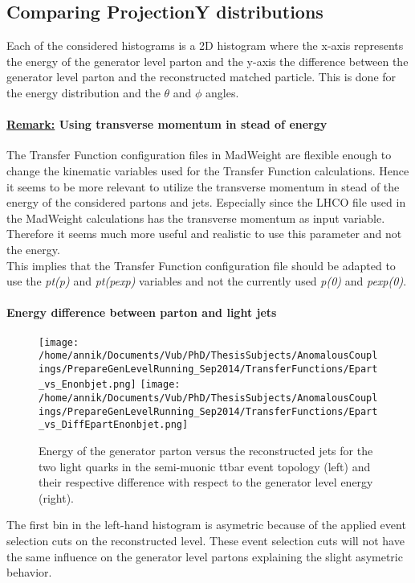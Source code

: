 \subsection{Comparing ProjectionY distributions}\label{subsubsec::FitRanges}
Each of the considered histograms is a 2D histogram where the x-axis represents the energy of the generator level parton and the y-axis the difference between the generator level parton and the reconstructed matched particle. This is done for the energy distribution and the $\theta$ and $\phi$ angles.

\paragraph{\underline{Remark:} Using transverse momentum in stead of energy\\}
The Transfer Function configuration files in MadWeight are flexible enough to change the kinematic variables used for the Transfer Function calculations. Hence it seems to be more relevant to utilize the transverse momentum in stead of the energy of the considered partons and jets. Especially since the LHCO file used in the MadWeight calculations has the transverse momentum as input variable. Therefore it seems much more useful and realistic to use this parameter and not the energy.\\
This implies that the Transfer Function configuration file should be adapted to use the \textit{pt(p)} and \textit{pt(pexp)} variables and not the currently used \textit{p(0)} and \textit{pexp(0)}.

\paragraph{Energy difference between parton and light jets\\}
\begin{figure}[!h]
  \centering
  \texttt{[image: /home/annik/Documents/Vub/PhD/ThesisSubjects/AnomalousCouplings/PrepareGenLevelRunning\_Sep2014/TransferFunctions/Epart\_vs\_Enonbjet.png]}
  \texttt{[image: /home/annik/Documents/Vub/PhD/ThesisSubjects/AnomalousCouplings/PrepareGenLevelRunning\_Sep2014/TransferFunctions/Epart\_vs\_DiffEpartEnonbjet.png]}
  \caption{Energy of the generator parton versus the reconstructed jets for the two light quarks in the semi-muonic ttbar event topology (left) and their respective difference with respect to the generator level energy (right).}
\end{figure}
The first bin in the left-hand histogram is asymetric because of the applied event selection cuts on the reconstructed level. These event selection cuts will not have the same influence on the generator level partons explaining the slight asymetric behavior.
\newpage

